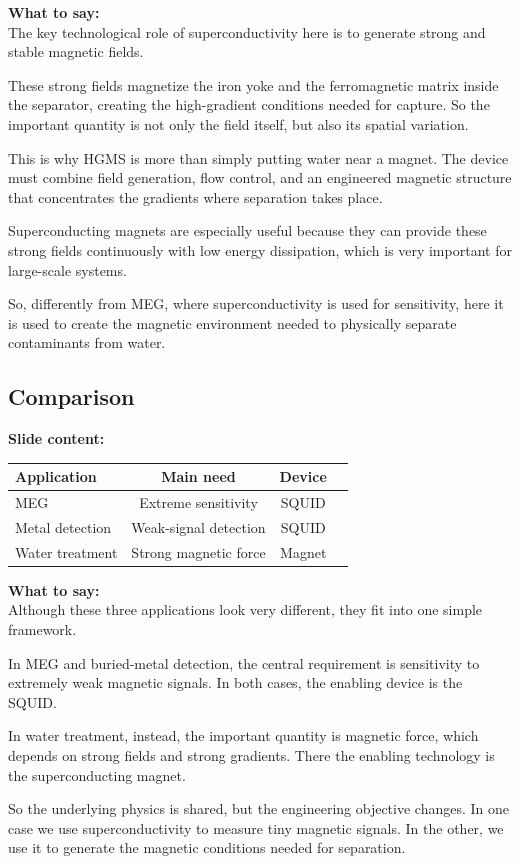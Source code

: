 \documentclass[11pt,a4paper]{article}
\newcommand{\points}[1]{{\color{accent}\textbf{Slide content:}}\\#1}
\newcommand{\speech}[1]{{\color{accent}\textbf{What to say:}}\\#1}
\begin{document}
\speech{
The key technological role of superconductivity here is to generate strong and stable magnetic fields.

These strong fields magnetize the iron yoke and the ferromagnetic matrix inside the separator, creating the high-gradient conditions needed for capture. So the important quantity is not only the field itself, but also its spatial variation.

This is why HGMS is more than simply putting water near a magnet. The device must combine field generation, flow control, and an engineered magnetic structure that concentrates the gradients where separation takes place.

Superconducting magnets are especially useful because they can provide these strong fields continuously with low energy dissipation, which is very important for large-scale systems.

So, differently from MEG, where superconductivity is used for sensitivity, here it is used to create the magnetic environment needed to physically separate contaminants from water.
}


\subsection{Comparison}

\points{
\begin{tabular}{lccc}
Application & Main need & Device \\
\hline
MEG & Extreme sensitivity & SQUID \\
Metal detection & Weak-signal detection & SQUID \\
Water treatment & Strong magnetic force & Magnet \\
\end{tabular}
}

\speech{
Although these three applications look very different, they fit into one simple framework.

In MEG and buried-metal detection, the central requirement is sensitivity to extremely weak magnetic signals. In both cases, the enabling device is the SQUID.

In water treatment, instead, the important quantity is magnetic force, which depends on strong fields and strong gradients. There the enabling technology is the superconducting magnet.

So the underlying physics is shared, but the engineering objective changes. In one case we use superconductivity to measure tiny magnetic signals. In the other, we use it to generate the magnetic conditions needed for separation.
}
\end{document}
